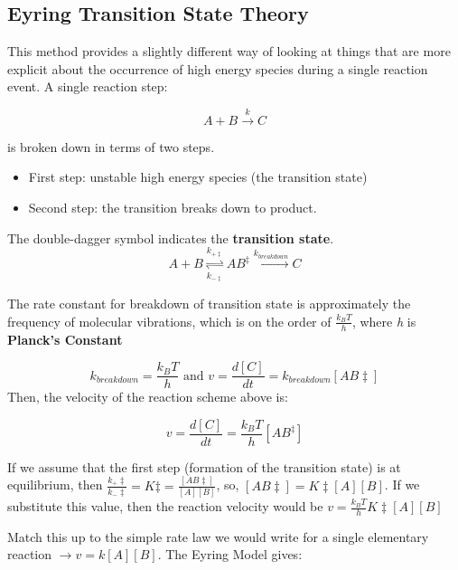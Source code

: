\documentclass[12pt, letterpaper]{article}
\begin{document}
\subsection*{Eyring Transition State Theory}
This method provides a slightly different way of looking at things that are more explicit about the occurrence of high energy species during 
a single reaction event. A single reaction step: 

\begin{equation}
    A + B \stackrel{k} \longrightarrow C
\end{equation}

is broken down in terms of two steps. 
\begin{itemize}
    \item First step: unstable high energy species (the transition state)
    \item Second step: the transition breaks down to product. 
\end{itemize}

The double-dagger symbol indicates the \textbf{transition state}. 
\begin{equation*}
    A + B \stackrel{k_{+ \ddagger }}{\underset{k_{- \ddagger}}{\rightleftharpoons}} AB^{\ddagger} \stackrel{k_{breakdown}} \longrightarrow C
\end{equation*}

The rate constant for breakdown of transition state is approximately 
the frequency of molecular vibrations, which is on the order of \textbf{$\frac{k_BT}{h}$}, where \emph{h} is \textbf{Planck's Constant}

\begin{equation}
    k_{breakdown} = \frac{k_BT}{h} \text{ and } v = \frac{d[C]}{dt} = k_{breakdown}[AB\ddagger]
\end{equation}
Then, the velocity of the reaction scheme above is: 

\begin{equation}
    v = \frac{d[C]}{dt} = \frac{k_BT}{h}[AB^{\ddagger}]
\end{equation}
\newpage

If we assume that the first step (formation of the transition state) is at 
equilibrium, then \( \frac{k_+ \ddagger}{k_- \ddagger} = K\ddagger = \frac{[AB\ddagger]}{[A][B]} \),
so, \( [AB\ddagger] = K\ddagger[A][B] \). If we substitute this value, 
then the reaction velocity would be \( v = \frac{k_BT}{h}K\ddagger[A][B] \)

Match this up to the simple rate law we would write for a single
elementary reaction \( \rightarrow v = k[A][B] \). The Eyring Model 
gives: 
\end{document}
